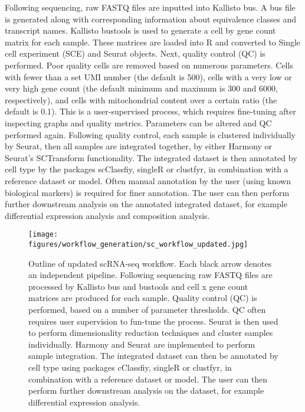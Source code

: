 Following sequencing, raw FASTQ files are inputted into Kallisto bus.
A bus file is generated along with corresponding information about equivalence classes and transcript names.
Kallisto bustools is used to generate a cell by gene count matrix for each sample.
These matrices are loaded into R and converted to Single cell experiment (SCE) and Seurat objects.
Next, quality control (QC) is performed.
Poor quality cells are removed based on numerous parameters.
Cells with fewer than a set UMI number (the default is 500), cells with a very low or very high gene count (the default minimum and maximum is 300 and 6000, respectively), and cells with mitochondrial content over a certain ratio (the default is 0.1).
This is a user-supervised process, which requires fine-tuning after inspecting graphs and quality metrics.
Parameters can be altered and QC performed again.
Following quality control, each sample is clustered individually by Seurat, then all samples are integrated together, by either Harmony or Seurat's SCTransform functionality.
The integrated dataset is then annotated by cell type by the packages scClassfiy, singleR or clustfyr, in combination with a reference dataset or model.
Often manual annotation by the user (using known biological markers) is required for finer annotation.
The user can then perform further downstream analysis on the annotated integrated dataset, for example differential expression analysis and composition analysis.

\begin{figure}[htb]
\centering
\texttt{[image: figures/workflow\_generation/sc\_workflow\_updated.jpg]}
\caption[Updated scRNA-seq workflow]{Outline of updated scRNA-seq workflow.
Each black arrow denotes an independent pipeline.
Following sequencing raw FASTQ files are processed by Kallisto bus and bustools and cell x gene count matrices are produced for each sample.
Quality control (QC) is performed, based on a number of parameter thresholds.
QC often requires user supervision to fun-tune the process.
Seurat is then used to perform dimensionality reduction techniques and cluster samples individually.
Harmony and Seurat are implemented to perform sample integration.
The integrated dataset can then be annotated by cell type using packages cClassfiy, singleR or clustfyr, in combination with a reference dataset or model.
The user can then perform further downstream analysis on the dataset, for example differential expression analysis.
}
\label{fig:updated_sc_workflow}
\end{figure}

